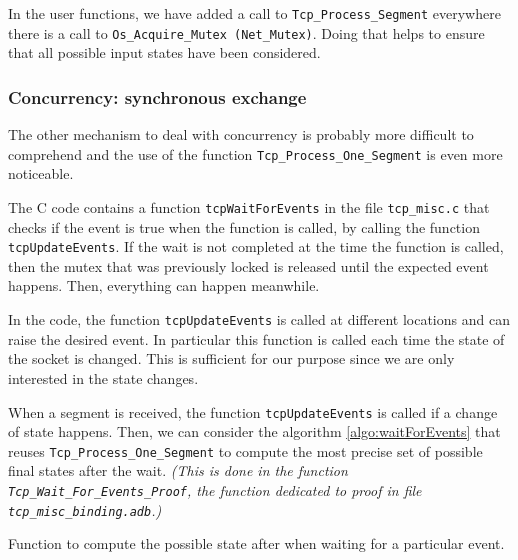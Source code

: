 \documentclass[a4paper, 10pt]{article}
\begin{document}
    In the user functions, we have added a call to \lstinline[language=Ada]{Tcp_Process_Segment} everywhere
    there is a call to \lstinline{Os_Acquire_Mutex (Net_Mutex)}. Doing that helps to ensure that all 
    possible input states have been considered.

    \subsubsection{Concurrency: synchronous exchange}
    \label{section:synchronous}

    The other mechanism to deal with concurrency is probably more difficult to comprehend and the
    use of the function \lstinline[language=Ada]{Tcp_Process_One_Segment} is even more noticeable.
    
    The C code contains a function \lstinline[language=C]{tcpWaitForEvents} in the file \texttt{tcp\_misc.c}
    that checks if the event is true when the function is called, by calling the function
    \lstinline[language=C]{tcpUpdateEvents}. If the wait is not completed at the time the function is
    called, then the mutex that was previously locked is released until the expected event happens.
    Then, everything can happen meanwhile.
    
    In the code, the function \lstinline[language=C]{tcpUpdateEvents} is called at different locations
    and can raise the desired event. In particular this function is called each time the state of
    the socket is changed. This is sufficient for our purpose since we are only interested in the state
    changes.

    When a segment is received, the function \lstinline[language=C]{tcpUpdateEvents} is called if a
    change of state happens. Then, we can consider the algorithm \ref{algo:waitForEvents} that reuses
    \lstinline[language=Ada]{Tcp_Process_One_Segment} to compute the most precise set of possible
    final states after the wait. \textit{(This is done in the function \lstinline[language=Ada]{Tcp_Wait_For_Events_Proof},
    the function dedicated to proof in file \texttt{tcp\_misc\_binding.adb}.)}

    \begin{algorithm}[t]
        \caption{Function to compute the possible state after when waiting for a particular event.}
        \label{algo:waitForEvents}
    \end{algorithm}
\end{document}
